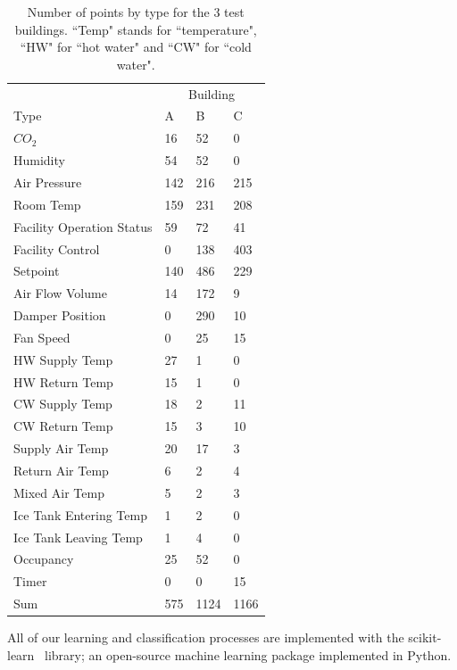 \begin{table}[t]
\centering
\begin{tabular}{l | l l l}
\hline
& \multicolumn{3}{c}{Building} \\
Type & A & B & C\\
\hline\hline
$CO_{2}$ & 16 & 52 & 0\\
Humidity & 54 & 52 & 0\\
Air Pressure & 142 & 216 & 215\\
Room Temp & 159 & 231 & 208\\
Facility Operation Status & 59 & 72 & 41\\
Facility Control & 0 & 138 & 403\\
Setpoint & 140 & 486 & 229\\
Air Flow Volume & 14 & 172 & 9\\
Damper Position & 0 & 290 & 10\\
Fan Speed & 0 & 25 & 15\\
HW Supply Temp & 27 & 1 & 0\\
HW Return Temp & 15 & 1 & 0\\
CW Supply Temp & 18 & 2 & 11\\
CW Return Temp & 15 & 3 & 10\\
Supply Air Temp & 20 & 17 & 3\\
Return Air Temp & 6 & 2 & 4\\
Mixed Air Temp & 5 & 2 & 3\\
Ice Tank Entering Temp & 1 & 2 & 0\\
Ice Tank Leaving Temp & 1 & 4 & 0\\
Occupancy & 25 & 52 & 0\\
Timer & 0 & 0 & 15\\ \hline
Sum & 575 & 1124 & 1166\\ \hline
\end{tabular}
\caption{Number of points by type for the 3 test buildings. ``Temp" stands for ``temperature", ``HW" for ``hot water" and ``CW" for ``cold water".}
\label{table:num}
\end{table}


All of our learning and classification processes are implemented with the scikit-learn~\cite{scikit} library; an open-source machine learning package 
implemented in Python. %


